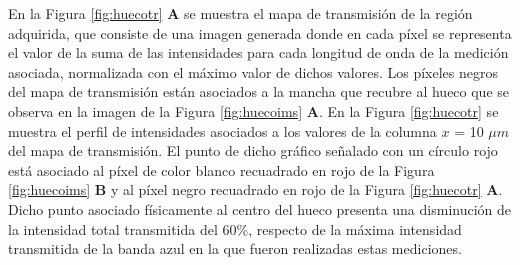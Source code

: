 En la Figura \ref{fig:huecotr} \textbf{A} se muestra el mapa de transmisión de la región adquirida, que consiste de una imagen generada donde en cada píxel se representa el valor de la suma de las intensidades para cada longitud de onda de la medición asociada, normalizada con el máximo valor de dichos valores. Los píxeles negros del mapa de transmisión están asociados a la mancha que recubre al hueco que se observa en la imagen de la Figura \ref{fig:huecoims} \textbf{A}.
En la Figura \ref{fig:huecotr} se muestra el perfil de intensidades asociados a los valores de la columna $\textit{x}$ = 10 $\mu m$ del mapa de transmisión. El punto de dicho gráfico señalado con un círculo rojo está asociado al píxel de color blanco recuadrado en rojo de la Figura \ref{fig:huecoims} \textbf{B} y al píxel negro recuadrado en rojo de la Figura \ref{fig:huecotr} \textbf{A}. Dicho punto asociado físicamente al centro del hueco presenta una disminución de la intensidad total transmitida del 60\%, respecto de la máxima intensidad transmitida de la banda azul en la que fueron realizadas estas mediciones.
